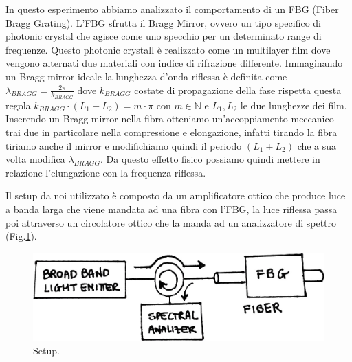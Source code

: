 
In questo esperimento abbiamo analizzato il comportamento di un FBG (Fiber Bragg Grating). L'FBG sfrutta il Bragg Mirror, ovvero un tipo specifico di photonic crystal che agisce come uno specchio per un determinato range di frequenze. Questo photonic crystall è realizzato come un multilayer film dove vengono alternati due materiali con indice di rifrazione differente. Immaginando un Bragg mirror ideale la lunghezza d'onda riflessa è definita come $\lambda_{BRAGG} = \frac{2\pi}{k_{BRAGG}}$ dove $k_{BRAGG}$ costate di propagazione della fase rispetta questa regola $k_{BRAGG} \cdot (L_1 + L_2) = m \cdot \pi$ con $m \in \mathbb{N}$ e $L_1, L_2$ le due lunghezze dei film. Inserendo un Bragg mirror nella fibra otteniamo un'accoppiamento meccanico trai due in particolare nella compressione e elongazione, infatti tirando la fibra tiriamo anche il mirror e modifichiamo quindi il periodo $(L_1 + L_2)$ che a sua volta modifica $\lambda_{BRAGG}$. Da questo effetto fisico possiamo quindi mettere in relazione l'elungazione con la frequenza riflessa.

Il setup da noi utilizzato è composto da un amplificatore ottico che produce luce a banda larga che viene mandata ad una fibra con l'FBG, la luce riflessa passa poi attraverso un circolatore ottico che la manda ad un analizzatore di spettro (Fig.\ref{fig:setup}).
\begin{figure}[h]
    \centering
    \includegraphics[scale=0.3]{img/setup.jpg}
    \caption{Setup.}
    \label{fig:setup}
\end{figure}

